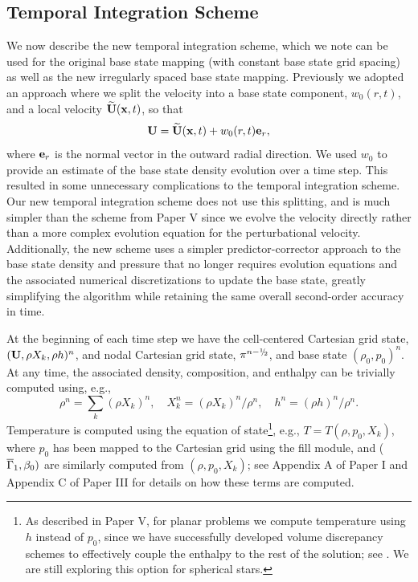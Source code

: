 \subsection{Temporal Integration Scheme}\label{Sec:Temporal Integration Scheme}
We now describe the new temporal integration scheme, which we note can be used for the original base state mapping (with constant base state grid spacing) as well as the new irregularly spaced base state mapping.
Previously we adopted an approach where we split the velocity into a base state component, $w_0(r,t)$, 
and a local velocity $\widetilde{{\bf{U}}}({\bf{x}},t)$, so that
\begin{equation}
\Ub = \Ubt(\xb,t) + w_0(r,t)\eb_r,
\end{equation}
where ${\bf{e}}_r$ is the normal vector in the outward radial direction.
We used $w_0$ to provide an estimate of the base state density evolution over a time step.
This resulted in some unnecessary complications to the temporal integration scheme.
Our new temporal integration scheme does not use this splitting, and is much simpler than the scheme from Paper V since we evolve the velocity directly rather than a more complex evolution equation for the perturbational velocity.
Additionally, the new scheme uses a simpler predictor-corrector approach to the base state density and pressure that no 
longer requires evolution equations and the associated numerical discretizations to update the base state, greatly 
simplifying the algorithm while retaining the same overall second-order accuracy in time.

At the beginning of each time step we have the cell-centered Cartesian grid state,
$({\bf{U}},\rho X_k,\rho h)^n$, and nodal Cartesian grid state, $\pi^{n-\myhalf}$, and base state $(\rho_0,p_0)^n$.
At any time, the associated density, composition, and enthalpy can be trivially computed using, e.g.,
\begin{equation}
\rho^n = \sum_k(\rho X_k)^n, \quad
X_k^n = (\rho X_k)^n / \rho^n, \quad
h^n = (\rho h)^n / \rho^n.
\end{equation}
Temperature is computed using the equation of state\footnote{As described in Paper V, for planar problems we compute temperature using $h$ instead of $p_0$, since we have successfully developed volume discrepancy schemes to effectively couple the enthalpy to the rest of the solution; see \cite{XRB_I}.  We are still exploring this option for spherical stars.}, e.g.,
$T = T(\rho,p_0,X_k)$, where $p_0$ has been mapped to the Cartesian grid using the fill module,
and ($\overline{\Gamma}_1,\beta_0)$ are similarly computed from $(\rho,p_0,X_k)$;
see Appendix A of Paper I and Appendix C of Paper III for details on how these terms are computed.

